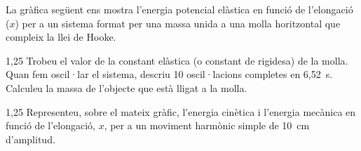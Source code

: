 La gràfica següent ens mostra l'energia potencial elàstica en funció de l'elongació ($x$) per a un sistema format per una massa unida a una molla horitzontal que compleix la llei de Hooke.


\begin{apartat}{1,25}
Trobeu el valor de la constant elàstica (o constant de rigidesa) de la molla. Quan fem oscil·lar el sistema, descriu 10 oscil·lacions completes en 6,52~s. Calculeu la massa de l'objecte que està lligat a la molla.
\end{apartat}

\begin{apartat}{1,25}
Representeu, sobre el mateix gràfic, l'energia cinètica i l'energia mecànica en funció de l'elongació, $x$, per a un moviment harmònic simple de 10~cm d'amplitud.
\end{apartat}
